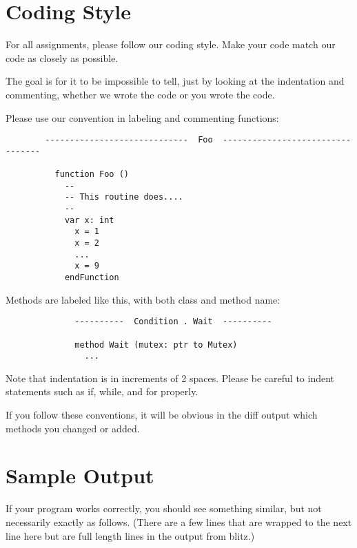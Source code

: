 \documentclass[12pt]{article}
\begin{document}
\section{Coding Style}

For all assignments, please follow our coding style.  Make your code
match our code as closely as possible.

The goal is for it to be impossible to tell, just by looking at the
indentation and commenting, whether we wrote the code or you wrote the
code.  

Please use our convention in labeling and commenting functions: 

\begin{verbatim}
        -----------------------------  Foo  ---------------------------------

          function Foo ()
            --
            -- This routine does....
            --
            var x: int
              x = 1
              x = 2
              ...
              x = 9
            endFunction
\end{verbatim}

Methods are labeled like this, with both class and method name:

\begin{verbatim}
              ----------  Condition . Wait  ----------
        
              method Wait (mutex: ptr to Mutex)
                ...
\end{verbatim}

Note that indentation is in increments of 2 spaces.  Please be careful
to indent statements such as if, while, and for properly.

If you follow these conventions, it will be obvious in the diff output
which methods you changed or added.


\section{Sample Output}

If your program works correctly, you should see something similar,
but not necessarily exactly as follows.  (There are a few lines
that are wrapped to the next line here but are full length lines
in the output from blitz.)
\end{document}
